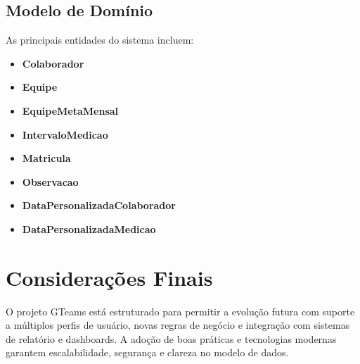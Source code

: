 \documentclass[12pt]{article}
\begin{document}
\subsection{Modelo de Domínio}

As principais entidades do sistema incluem:
\begin{itemize}
    \item \textbf{Colaborador}
    \item \textbf{Equipe}
    \item \textbf{EquipeMetaMensal}
    \item \textbf{IntervaloMedicao}
    \item \textbf{Matricula}
    \item \textbf{Observacao}
    \item \textbf{DataPersonalizadaColaborador}
    \item \textbf{DataPersonalizadaMedicao}
\end{itemize}

\section{Considerações Finais}

O projeto GTeams está estruturado para permitir a evolução futura com suporte a múltiplos perfis de usuário, novas regras de negócio e integração com sistemas de relatório e dashboards. A adoção de boas práticas e tecnologias modernas garantem escalabilidade, segurança e clareza no modelo de dados.
\end{document}
